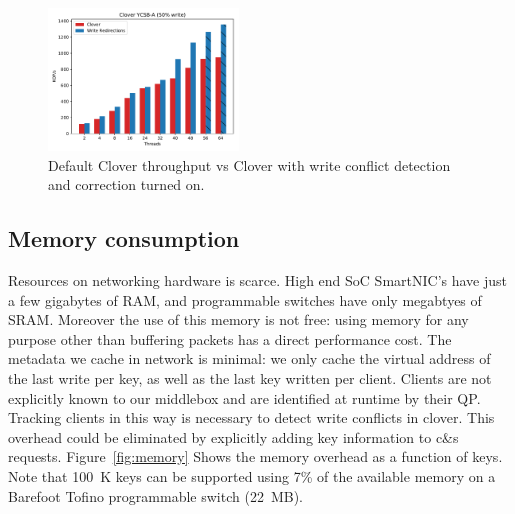 \begin{figure}
    \includegraphics[width=0.45\textwidth]{fig/throughput.pdf}
    \caption{Default Clover throughput vs Clover with write conflict
    detection and correction turned on.}
    \label{fig:throughput}
\end{figure}

\subsection{Memory consumption}

Resources on networking hardware is scarce. High end SoC SmartNIC's
have just a few gigabytes of RAM, and programmable switches have only
megabtyes of SRAM. Moreover the use of this memory is not free: using
memory for any purpose other than buffering packets has a direct
performance cost.
The metadata we cache in network is minimal:
we only
cache the virtual address of the last write per key,
as well as the last key written per client. Clients are not
explicitly known to our middlebox and are identified at runtime by
their QP. Tracking clients in this way is necessary to detect write
conflicts in clover. This overhead could be eliminated by explicitly
adding key information to c\&s requests.
%
Figure~\ref{fig:memory} Shows the memory overhead as a function of
keys. Note that 100~K keys can be supported using 7\% of the available
memory on a Barefoot Tofino programmable switch (22~MB).


